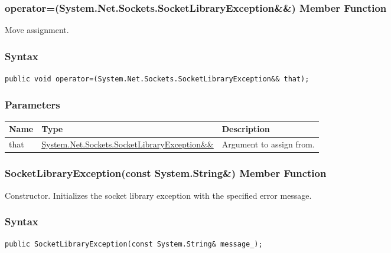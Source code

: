 \documentclass[a4paper,oneside,11.000000pt]{book}
\begin{document}
\hypertarget{System.Net.Sockets.SocketLibraryException.operator.assign.P.System.Net.Sockets.SocketLibraryException.RR.System.Net.Sockets.SocketLibraryException}{\subsubsection*{operator=(System.Net.Sockets.SocketLibraryException\&\&) Member Function}}\begin{flushleft}
Move assignment.

\end{flushleft}
\subsubsection*{Syntax}
\texttt{public void operator=(System.Net.Sockets.SocketLibraryException\&\& that);}
\subsubsection*{Parameters}
\begin{flushleft}
\begin{supertabular}[l]{!{\raggedright}p{1.30721cm}!{\raggedright}p{8.55945cm}!{\raggedright}p{4.93333cm}}
\textbf{Name}
& \textbf{Type}
& \textbf{Description}
\\
\hline
that
& \hyperlink{System.Net.Sockets.SocketLibraryException}{System.\-Net.\-Sockets.\-SocketLibraryException\&\-\&\-}
& Argument to assign from.

\\
\end{supertabular}

\end{flushleft}
\clearpage

\hypertarget{System.Net.Sockets.SocketLibraryException.constructor.P.System.Net.Sockets.SocketLibraryException.C.R.System.String}{\subsubsection*{SocketLibraryException(const System.String\&) Member Function}}
\begin{flushleft}
Constructor. Initializes the socket library exception with the specified error message.

\end{flushleft}
\subsubsection*{Syntax}
\texttt{public SocketLibraryException(const System.String\& message\_);}
\end{document}
